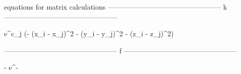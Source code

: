 equations for matrix calculations
------------------------------------------------
   k
------------------------------------------------

e^{c_{j} \left(- \left(x_{i} - x_{j}\right)^{2} - \left(y_{i} - y_{j}\right)^{2} - \left(z_{i} - z_{j}\right)^{2}\right)}

------------------------------------------------
   f
------------------------------------------------

- \epsilon e^{- \epsilon \left{}\right\rvert} 

